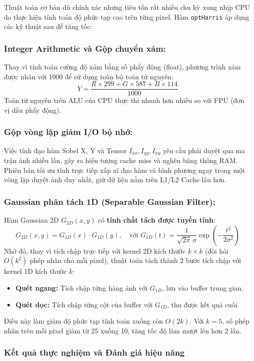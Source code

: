 Thuật toán cơ bản dù chính xác nhưng tiêu tốn rất nhiều chu kỳ xung nhịp CPU do thực hiện tính toán độ phức tạp cao trên từng pixel. Hàm \texttt{optHarris} áp dụng các kỹ thuật sau để tăng tốc:

\subsubsection{Integer Arithmetic và Gộp chuyển xám:}
Thay vì tính toán cường độ xám bằng số phẩy động (float), phương trình xám được nhân với 1000 để sử dụng toàn bộ toán tử nguyên:
$$Y = \frac{R \times 299 + G \times 587 + B \times 114}{1000}$$
Toán tử nguyên trên ALU của CPU thực thi nhanh hơn nhiều so với FPU (đơn vị dấu phẩy động).

\subsubsection{Gộp vòng lặp giảm I/O bộ nhớ:}
Việc tính đạo hàm Sobel X, Y và Tensor $I_{xx}, I_{yy}, I_{xy}$ yêu cầu phải duyệt qua ma trận ảnh nhiều lần, gây ra hiện tượng cache miss và nghẽn băng thông RAM. Phiên bản tối ưu tính trực tiếp xấp xỉ đạo hàm và bình phương ngay trong một vòng lặp duyệt ảnh duy nhất, giữ dữ liệu nằm trên L1/L2 Cache lâu hơn.

\subsubsection{Gaussian phân tách 1D (Separable Gaussian Filter):}
Hàm Gaussian 2D $G_{2D}(x, y)$ có \textbf{tính chất tách được tuyến tính}:
$$G_{2D}(x, y) = G_{1D}(x) \cdot G_{1D}(y), \quad \text{với } G_{1D}(t) = \frac{1}{\sqrt{2\pi}\,\sigma}\exp\!\left(-\frac{t^2}{2\sigma^2}\right)$$
Nhờ đó, thay vì tích chập trực tiếp với kernel 2D kích thước $k \times k$ (đòi hỏi $O(k^2)$ phép nhân cho mỗi pixel), thuật toán tách thành 2 bước tích chập với kernel 1D kích thước $k$:
\begin{itemize}
    \item \textbf{Quét ngang:} Tích chập từng hàng ảnh với $G_{1D}$, lưu vào buffer trung gian.
    \item \textbf{Quét dọc:} Tích chập từng cột của buffer với $G_{1D}$, thu được kết quả cuối.
\end{itemize}
Điều này làm giảm độ phức tạp tính toán xuống còn $O(2k)$. Với $k=5$, số phép nhân trên mỗi pixel giảm từ 25 xuống 10, tăng tốc độ làm mượt lên hơn 2 lần.

\subsubsection{Kết quả thực nghiệm và Đánh giá hiệu năng}

